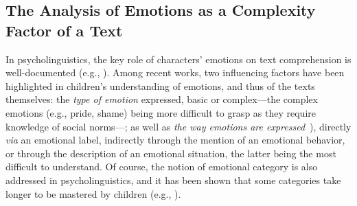 \subsection{The Analysis of Emotions as a Complexity Factor of a Text }\label{subsec:annotation}

In psycholinguistics, the key role of characters' emotions on text comprehension is well-documented (e.g., \citealp{dijkstra_character_1995,dyer_role_1983}). Among recent works, two influencing factors have been highlighted in children's understanding of emotions, and thus of the texts themselves: the \textit{type of emotion} expressed, basic or complex---the complex emotions (e.g., pride, shame) being more difficult to grasp as they require knowledge of social norms---\citep{davidson_role_2006,blanc_production_2017}; as well as \textit{the way emotions are expressed}~\citep{creissen-blanc2017}), directly \textit{via} an emotional label, indirectly through the mention of an emotional behavior, or through the description of an emotional situation, the latter being the most difficult to understand. Of course, the notion of emotional category is also addressed in psycholinguistics, and it has been shown that some categories take longer to be mastered by children (e.g., \citealp{baron-cohen_emotion_2010}).

